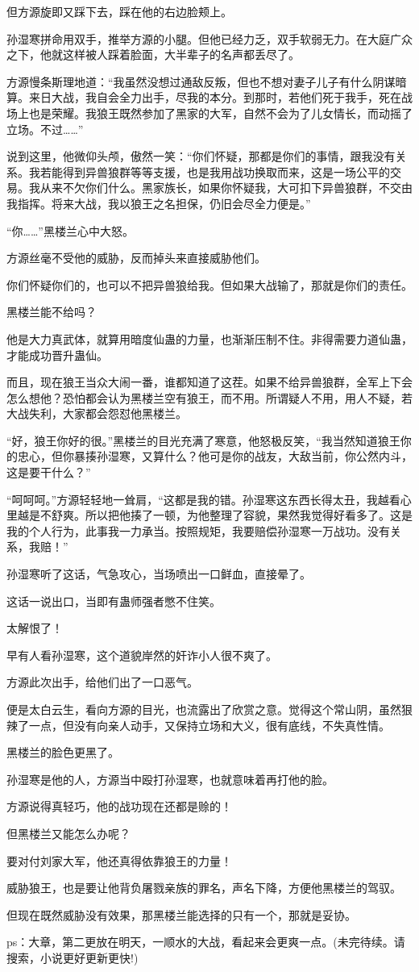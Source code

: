 \begin{this_body}
但方源旋即又踩下去，踩在他的右边脸颊上。

孙湿寒拼命用双手，推举方源的小腿。但他已经力乏，双手软弱无力。在大庭广众之下，他就这样被人踩着脸面，大半辈子的名声都丢尽了。

方源慢条斯理地道：“我虽然没想过通敌反叛，但也不想对妻子儿子有什么阴谋暗算。来日大战，我自会全力出手，尽我的本分。到那时，若他们死于我手，死在战场上也是荣耀。我狼王既然参加了黑家的大军，自然不会为了儿女情长，而动摇了立场。不过……”

说到这里，他微仰头颅，傲然一笑：“你们怀疑，那都是你们的事情，跟我没有关系。我若能得到异兽狼群等等支援，也是我用战功换取而来，这是一场公平的交易。我从来不欠你们什么。黑家族长，如果你怀疑我，大可扣下异兽狼群，不交由我指挥。将来大战，我以狼王之名担保，仍旧会尽全力便是。”

“你……”黑楼兰心中大怒。

方源丝毫不受他的威胁，反而掉头来直接威胁他们。

你们怀疑你们的，也可以不把异兽狼给我。但如果大战输了，那就是你们的责任。

黑楼兰能不给吗？

他是大力真武体，就算用暗度仙蛊的力量，也渐渐压制不住。非得需要力道仙蛊，才能成功晋升蛊仙。

而且，现在狼王当众大闹一番，谁都知道了这茬。如果不给异兽狼群，全军上下会怎么想他？恐怕都会认为黑楼兰空有狼王，而不用。所谓疑人不用，用人不疑，若大战失利，大家都会怨怼他黑楼兰。

“好，狼王你好的很。”黑楼兰的目光充满了寒意，他怒极反笑，“我当然知道狼王你的忠心，但你暴揍孙湿寒，又算什么？他可是你的战友，大敌当前，你公然内斗，这是要干什么？”

“呵呵呵。”方源轻轻地一耸肩，“这都是我的错。孙湿寒这东西长得太丑，我越看心里越是不舒爽。所以把他揍了一顿，为他整理了容貌，果然我觉得好看多了。这是我的个人行为，此事我一力承当。按照规矩，我要赔偿孙湿寒一万战功。没有关系，我赔！”

孙湿寒听了这话，气急攻心，当场喷出一口鲜血，直接晕了。

这话一说出口，当即有蛊师强者憋不住笑。

太解恨了！

早有人看孙湿寒，这个道貌岸然的奸诈小人很不爽了。

方源此次出手，给他们出了一口恶气。

便是太白云生，看向方源的目光，也流露出了欣赏之意。觉得这个常山阴，虽然狠辣了一点，但没有向亲人动手，又保持立场和大义，很有底线，不失真性情。

黑楼兰的脸色更黑了。

孙湿寒是他的人，方源当中殴打孙湿寒，也就意味着再打他的脸。

方源说得真轻巧，他的战功现在还都是赊的！

但黑楼兰又能怎么办呢？

要对付刘家大军，他还真得依靠狼王的力量！

威胁狼王，也是要让他背负屠戮亲族的罪名，声名下降，方便他黑楼兰的驾驭。

但现在既然威胁没有效果，那黑楼兰能选择的只有一个，那就是妥协。

ps：大章，第二更放在明天，一顺水的大战，看起来会更爽一点。(未完待续。请搜索，小说更好更新更快!)

\end{this_body}

